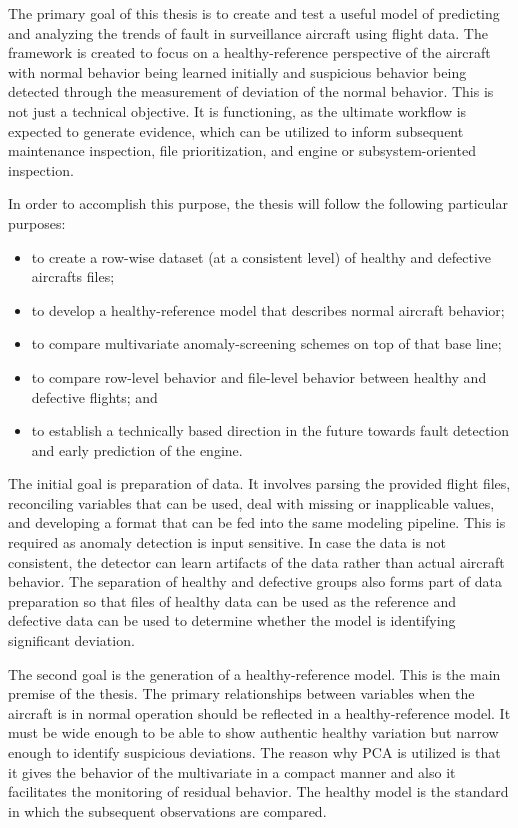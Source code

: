 \documentclass[12pt,a4paper]{report}
\begin{document}
	The primary goal of this thesis is to create and test a useful model of predicting and analyzing the trends of fault in surveillance aircraft using flight data. The framework is created to focus on a healthy-reference perspective of the aircraft with normal behavior being learned initially and suspicious behavior being detected through the measurement of deviation of the normal behavior. This is not just a technical objective. It is functioning, as the ultimate workflow is expected to generate evidence, which can be utilized to inform subsequent maintenance inspection, file prioritization, and engine or subsystem-oriented inspection.
	
	In order to accomplish this purpose, the thesis will follow the following particular purposes:
	
	\begin{itemize}
		\item to create a row-wise dataset (at a consistent level) of healthy and defective aircrafts files;
		\item to develop a healthy-reference model that describes normal aircraft behavior;
		\item to compare multivariate anomaly-screening schemes on top of that base line;
		\item to compare row-level behavior and file-level behavior between healthy and defective flights; and
		\item to establish a technically based direction in the future towards fault detection and early prediction of the engine.
	\end{itemize}
	
	The initial goal is preparation of data. It involves parsing the provided flight files, reconciling variables that can be used, deal with missing or inapplicable values, and developing a format that can be fed into the same modeling pipeline. This is required as anomaly detection is input sensitive. In case the data is not consistent, the detector can learn artifacts of the data rather than actual aircraft behavior. The separation of healthy and defective groups also forms part of data preparation so that files of healthy data can be used as the reference and defective data can be used to determine whether the model is identifying significant deviation.
	
	The second goal is the generation of a healthy-reference model. This is the main premise of the thesis. The primary relationships between variables when the aircraft is in normal operation should be reflected in a healthy-reference model. It must be wide enough to be able to show authentic healthy variation but narrow enough to identify suspicious deviations. The reason why PCA is utilized is that it gives the behavior of the multivariate in a compact manner and also it facilitates the monitoring of residual behavior. The healthy model is the standard in which the subsequent observations are compared.
	
\end{document}
